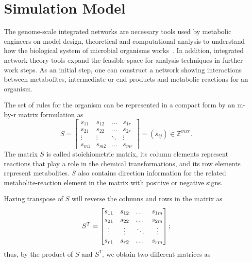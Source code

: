 \section{Simulation Model}
The genome-scale integrated networks are necessary tools used by metabolic engineers on model design, theoretical and computational analysis to understand how the biological system of microbial organisms works~\cite{HAO}. In addition, integrated network theory tools expand the feasible space for analysis techniques in further work steps. As an initial step, one can construct a network showing interactions between metabolites, intermediate or end products and metabolic reactions for an organism. 

The set of rules for the organism can be represented in a compact form by an m-by-r matrix formulation as
\begin{equation} %
	S =  \begin{bmatrix} 
		s_{11} & s_{12} & \dots  & s_{1r}\\
		s_{21} & s_{22} & \dots  & s_{2r}\\
		\vdots & \vdots &\ddots & \vdots \\
		s_{m1} & s_{m2} & \dots & s_{mr} 
	\end{bmatrix}=(s_{ij})\in \mathbb{Z}^{mxr}.
	\label{stoichio}
\end{equation}
The matrix $S$ is called stoichiometric matrix, its column elements represent reactions that play a role in the chemical transformations, and its row elements represent metabolites. $S$ also contains direction information for the related metabolite-reaction element in the matrix with positive or negative signs.~\cite{klipp2005systems} 

Having transpose of $S$ will reverse the columns and rows in the matrix as 
\begin{equation}
	S^{T} =  \begin{bmatrix} 
		s_{11} & s_{12} & \dots  & s_{1m}\\
		s_{21} & s_{22} & \dots  & s_{2m}\\
		\vdots & \vdots &\ddots & \vdots \\
		s_{r1} & s_{r2} & \dots & s_{rm} 
	\end{bmatrix};
	\notag
\end{equation}
thus, by the product of $S$ and $S^{T}$, we obtain two different matrices as


